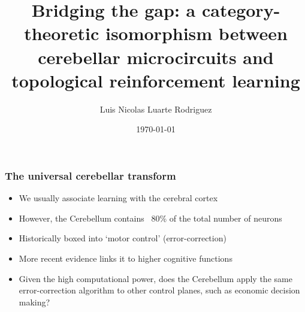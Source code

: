 \documentclass[aspectratio=169]{beamer}
\title{\textbf{Bridging the gap: a category-theoretic isomorphism between cerebellar microcircuits and topological reinforcement learning}}
\author{Luis Nicolas Luarte Rodriguez}
\institute{CICS}
\date{\today}
\begin{document}
	
	\begin{frame} 
		\titlepage
	\end{frame}
	
	\begin{frame}
		\frametitle{The universal cerebellar transform}
		\begin{itemize}
			\item We usually associate learning with the cerebral cortex
			\item However, the Cerebellum contains ~80\% of the total number of neurons
			\item Historically boxed into `motor control' (error-correction) \parencite{glicksteinThinkingCerebellum2006}
			\item More recent evidence links it to higher cognitive functions \parencite{bucknerOrganizationHumanCerebellum2011}
			\item Given the high computational power, does the Cerebellum apply the same error-correction algorithm to other control planes, such as economic decision making?
		\end{itemize}
	\end{frame}
	
\end{document}
